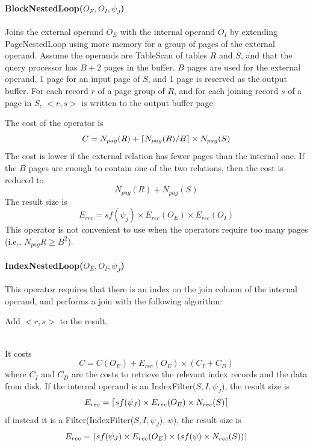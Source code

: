 \paragraph{BlockNestedLoop($O_E, O_I, \psi_J$)}
Joins the external operand $O_E$ with the internal operand $O_I$ by extending PageNestedLoop using more memory for a group of pages of the external operand. Assume the operands are TableScan of tables $R$ and $S$, and that the query processor has $B+2$ pages in the buffer. $B$ pages are used for the external operand, 1 page for an input page of $S$, and 1 page is reserved as the output buffer. For each record $r$ of a page group of $R$, and for each joining record $s$ of a page in $S$, $<r,s>$ is written to the output buffer page.

The cost of the operator is
\begin{equation*}
    C = N_{pag}(R) + \left\lceil N_{pag}(R)/B\right\rceil \times N_{pag}(S)
\end{equation*}
The cost is lower if the external relation has fewer pages than the internal one. If the $B$ pages are enough to contain one of the two relations, then the cost is reduced to
\begin{equation*}
    N_{pag}(R) + N_{pag}(S)
\end{equation*}
The result size is
\begin{equation*}
    E_{rec} = sf(\psi_j) \times E_{rec}(O_E) \times E_{rec}(O_I)
\end{equation*}
This operator is not convenient to use when the operators require too many pages (i.e., $N_{pag}R \geq B^2$).

\paragraph{IndexNestedLoop($O_E, O_I, \psi_J$)}
This operator requires that there is an index on the join column of the internal operand, and performs a join with the following algorithm:
\begin{algorithm}
\begin{algorithmic}
            \State Add $<r,s>$ to the result.
        \EndFor
    \EndFor
\end{algorithmic}
\end{algorithm} \\
It costs
\begin{equation*}
    C = C(O_E) + E_{rec}(O_E) \times (C_I + C_D)
\end{equation*}
where $C_I$ and $C_D$ are the costs to retrieve the relevant index records and the data from disk. If the internal operand is an IndexFilter($S,I,\psi_J$), the result size is
\begin{equation*}
    E_{rec} = \left\lceil sf(\psi_J) \times E_{rec}(O_E) \times N_{rec}(S)\right\rceil
\end{equation*}
if instead it is a Filter(IndexFilter($S, I, \psi_J$), $\psi$), the result size is
\begin{equation*}
    E_{rec} = \left\lceil sf(\psi_J) \times E_{rec}(O_E) \times (sf(\psi) \times N_{rec}(S))\right\rceil
\end{equation*}

